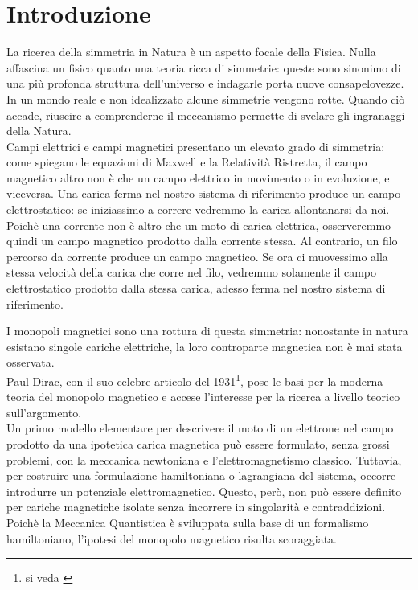 \chapter*{Introduzione}

La ricerca della simmetria in Natura è un aspetto focale della Fisica. Nulla
affascina un fisico quanto una teoria ricca di simmetrie: queste sono sinonimo
di una più profonda struttura dell'universo e indagarle porta nuove consapelovezze.
In un mondo reale e non idealizzato alcune simmetrie vengono rotte. Quando ciò
accade, riuscire a comprenderne il meccanismo permette di svelare gli ingranaggi
della Natura.\\

Campi elettrici e campi magnetici presentano un elevato grado di simmetria: come
spiegano le equazioni di Maxwell e la Relatività Ristretta, il campo magnetico
altro non è che un campo elettrico in movimento o in evoluzione, e viceversa.
Una carica ferma nel nostro sistema di riferimento produce un campo elettrostatico:
se iniziassimo a correre vedremmo la carica allontanarsi da noi. Poichè
una corrente non è altro che un moto di carica elettrica, osserveremmo quindi un campo
magnetico prodotto dalla corrente stessa.
Al contrario, un filo percorso da corrente produce un campo magnetico. Se ora ci muovessimo
alla stessa velocità della carica che corre nel filo, vedremmo solamente il campo
elettrostatico prodotto dalla stessa carica, adesso ferma nel nostro sistema di riferimento.

I monopoli magnetici sono una rottura di questa simmetria: nonostante in natura
esistano singole cariche elettriche, la loro controparte magnetica non è mai
stata osservata.\\

Paul Dirac, con il suo celebre articolo del 1931\footnote{si veda \cite{dirac}}, pose le basi per
la moderna teoria del monopolo magnetico e accese l'interesse per la ricerca a
livello teorico sull'argomento.\\
Un primo modello elementare per descrivere il moto di un elettrone
nel campo prodotto da una ipotetica carica magnetica può essere formulato,
senza grossi problemi, con la meccanica newtoniana e l'elettromagnetismo classico.
Tuttavia, per costruire una formulazione hamiltoniana o lagrangiana del sistema,
occorre introdurre un potenziale elettromagnetico. Questo, però, non può essere
definito per cariche magnetiche isolate senza incorrere in singolarità e contraddizioni.
Poichè la Meccanica Quantistica è sviluppata sulla base di un formalismo
hamiltoniano, l'ipotesi del monopolo magnetico risulta scoraggiata.

